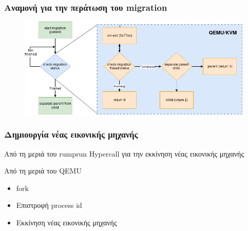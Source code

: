 \documentclass[red,slidestop,notes,compress,mathserif]{beamer}
\begin{document}

\begin{frame}
\frametitle{Αναμονή για την περάτωση του migration}
\begin{figure}
\center
\includegraphics[scale=0.44]{figures/check_migration_status_colored.png}
\end{figure}
\end{frame}

\begin{frame}
\frametitle{Δημιουργία νέας εικονικής μηχανής}
\begin{block}{Από τη μεριά του rumprun}
Hypercall για την εκκίνηση νέας εικονικής μηχανής
\end{block}
\begin{block}{Από τη μεριά του QEMU}
\begin{itemize}
\item fork 
\item Επιστροφή process id 
\item Εκκίνηση νέας εικονικής μηχανής 
\end{itemize}
\end{block}
\end{frame}
\end{document}
